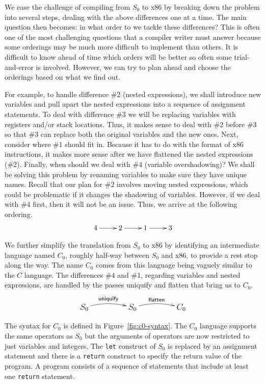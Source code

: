 \documentclass[12pt]{book}
\newcommand{\key}[1]{\texttt{#1}}
\begin{document}
We ease the challenge of compiling from $S_0$ to x86 by breaking down
the problem into several steps, dealing with the above differences one
at a time. The main question then becomes: in what order to we tackle
these differences? This is often one of the most challenging questions
that a compiler writer must answer because some orderings may be much
more difficult to implement than others. It is difficult to know ahead
of time which orders will be better so often some trial-and-error is
involved. However, we can try to plan ahead and choose the orderings
based on what we find out.

For example, to handle difference \#2 (nested expressions), we shall
introduce new variables and pull apart the nested expressions into a
sequence of assignment statements.  To deal with difference \#3 we
will be replacing variables with registers and/or stack
locations. Thus, it makes sense to deal with \#2 before \#3 so that
\#3 can replace both the original variables and the new ones. Next,
consider where \#1 should fit in. Because it has to do with the format
of x86 instructions, it makes more sense after we have flattened the
nested expressions (\#2). Finally, when should we deal with \#4
(variable overshadowing)?  We shall be solving this problem by
renaming variables to make sure they have unique names. Recall that
our plan for \#2 involves moving nested expressions, which could be
problematic if it changes the shadowing of variables. However, if we
deal with \#4 first, then it will not be an issue.  Thus, we arrive at
the following ordering.
\[
\xymatrix{
4 \ar[r] & 2 \ar[r] & 1 \ar[r] & 3
}
\]

We further simplify the translation from $S_0$ to x86 by identifying
an intermediate language named $C_0$, roughly half-way between $S_0$
and x86, to provide a rest stop along the way. The name $C_0$ comes
from this language being vaguely similar to the $C$ language. The
differences \#4 and \#1, regarding variables and nested expressions,
are handled by the passes \textsf{uniquify} and \textsf{flatten} that
bring us to $C_0$.
\[\large
\xymatrix@=50pt{
  S_0 \ar@/^/[r]^-{\textsf{uniquify}} & 
  S_0 \ar@/^/[r]^-{\textsf{flatten}} &
  C_0 
}
\]

The syntax for $C_0$ is defined in Figure~\ref{fig:c0-syntax}.  The
$C_0$ language supports the same operators as $S_0$ but the arguments
of operators are now restricted to just variables and integers. The
\key{let} construct of $S_0$ is replaced by an assignment statement
and there is a \key{return} construct to specify the return value of
the program. A program consists of a sequence of statements that
include at least one \key{return} statement.
\end{document}
